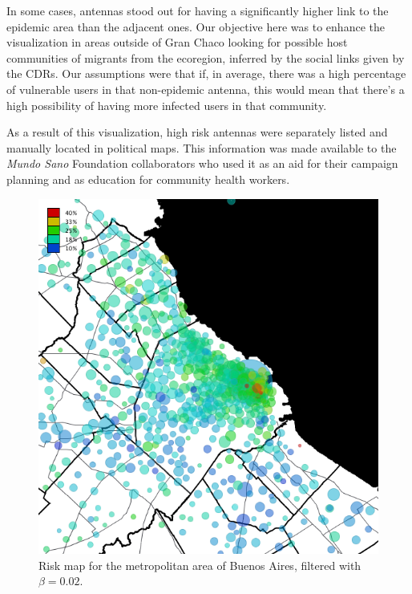 In some cases, antennas stood out for having a significantly higher link to the epidemic area than the adjacent ones. Our objective here was to enhance the visualization in areas outside of Gran Chaco looking for possible host communities of migrants from the ecoregion, inferred by the social links given by the CDRs. Our assumptions were that if, in average, there was a high percentage of vulnerable users in that non-epidemic antenna, this would mean that there's a high possibility of having more infected users in that community.

As a result of this visualization, high risk antennas were separately listed and manually located in political maps. This information was made available to the \textit{Mundo Sano} Foundation collaborators who used it as an aid for their campaign planning and as education for community health workers.


\begin{figure}[p]
	\caption{Risk map for the metropolitan area of Buenos Aires, filtered with $\beta = 0.02$.}\label{fig:amba_map}
	\centering
	\includegraphics[width=0.65\linewidth]
	{figures/201112_hi_res_amba_usuarios_proporcion_circulos_beta2/201112_hi_res_amba_usuarios_proporcion_circulos_beta2}
\end{figure}

